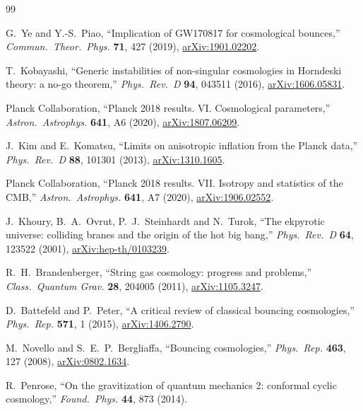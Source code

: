 \documentclass[a4paper,11pt]{article}
\begin{document}
\begin{thebibliography}{99}

G.~Ye and Y.-S.~Piao,
``Implication of GW170817 for cosmological bounces,''
\textit{Commun.\ Theor.\ Phys.} \textbf{71}, 427 (2019),
\href{https://arxiv.org/abs/1901.02202}{arXiv:1901.02202}.

T.~Kobayashi,
``Generic instabilities of non-singular cosmologies in Horndeski theory: a no-go theorem,''
\textit{Phys.\ Rev.\ D} \textbf{94}, 043511 (2016),
\href{https://arxiv.org/abs/1606.05831}{arXiv:1606.05831}.

Planck Collaboration,
``Planck 2018 results. VI. Cosmological parameters,''
\textit{Astron.\ Astrophys.} \textbf{641}, A6 (2020),
\href{https://arxiv.org/abs/1807.06209}{arXiv:1807.06209}.

J.~Kim and E.~Komatsu,
``Limits on anisotropic inflation from the Planck data,''
\textit{Phys.\ Rev.\ D} \textbf{88}, 101301 (2013),
\href{https://arxiv.org/abs/1310.1605}{arXiv:1310.1605}.

Planck Collaboration,
``Planck 2018 results. VII. Isotropy and statistics of the CMB,''
\textit{Astron.\ Astrophys.} \textbf{641}, A7 (2020),
\href{https://arxiv.org/abs/1906.02552}{arXiv:1906.02552}.

J.~Khoury, B.~A.~Ovrut, P.~J.~Steinhardt and N.~Turok,
``The ekpyrotic universe: colliding branes and the origin of the hot big bang,''
\textit{Phys.\ Rev.\ D} \textbf{64}, 123522 (2001),
\href{https://arxiv.org/abs/hep-th/0103239}{arXiv:hep-th/0103239}.

R.~H.~Brandenberger,
``String gas cosmology: progress and problems,''
\textit{Class.\ Quantum Grav.} \textbf{28}, 204005 (2011),
\href{https://arxiv.org/abs/1105.3247}{arXiv:1105.3247}.

D.~Battefeld and P.~Peter,
``A critical review of classical bouncing cosmologies,''
\textit{Phys.\ Rep.} \textbf{571}, 1 (2015),
\href{https://arxiv.org/abs/1406.2790}{arXiv:1406.2790}.

M.~Novello and S.~E.~P.~Bergliaffa,
``Bouncing cosmologies,''
\textit{Phys.\ Rep.} \textbf{463}, 127 (2008),
\href{https://arxiv.org/abs/0802.1634}{arXiv:0802.1634}.

R.~Penrose,
``On the gravitization of quantum mechanics 2: conformal cyclic cosmology,''
\textit{Found.\ Phys.} \textbf{44}, 873 (2014).


\end{thebibliography}
\end{document}
